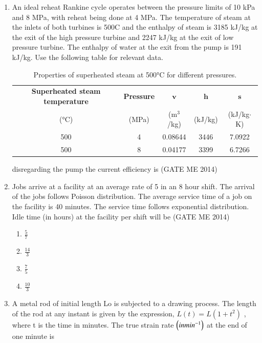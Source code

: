 \documentclass[journal]{IEEEtran}
\numberwithin{equation}{enumi}
\numberwithin{figure}{enumi}
\begin{document}
\begin{enumerate}
\item An ideal reheat Rankine cycle operates between the pressure limits of 10 kPa and 8 MPa, with
reheat being done at 4 MPa. The temperature of steam at the inlets of both turbines is 500C and
the enthalpy of steam is 3185 kJ/kg at the exit of the high pressure turbine and 2247 kJ/kg at the
exit of low pressure turbine. The enthalpy of water at the exit from the pump is 191 kJ/kg. Use the
following table for relevant data. 
\begin{table}[h!]
\centering
\begin{tabular}{|c|c|c|c|c|}
\hline
\textbf{Superheated steam temperature} & \textbf{Pressure} & $\boldsymbol{v}$ & $\boldsymbol{h}$ & $\boldsymbol{s}$ \\
(°C) & (MPa) & (m$^3$/kg) & (kJ/kg) & (kJ/kg$\cdot$K) \\
\hline
500 & 4 & 0.08644 & 3446 & 7.0922 \\
500 & 8 & 0.04177 & 3399 & 6.7266 \\
\hline
\end{tabular}
\caption{Properties of superheated steam at 500°C for different pressures.}
\end{table}
disregarding the pump the current efficiency is 
 \hfill{(GATE ME 2014)}

\item Jobs arrive at a facility at an average rate of 5 in an 8 hour shift. The arrival of the jobs follows
Poisson distribution. The average service time of a job on the facility is 40 minutes. The service
time follows exponential distribution. Idle time (in hours) at the facility per shift will be
\hfill{(GATE ME 2014)}

\begin{multicols}{4}
    \begin{enumerate}
        \item $\frac{5}{7}$
         \item $\frac{14}{3}$
          \item $\frac{7}{5}$
           \item $\frac{10}{3}$
    \end{enumerate}
\end{multicols}

  
\item A metal rod of initial length Lo is subjected to a drawing process. The length of the rod at any
instant is given by the expression, $L(t)=L(1+t^2)$ , where t is the time in minutes. The true strain rate $\left(in min^{-1}\right)$ at the end of one minute is


\end{enumerate}
\end{document}
